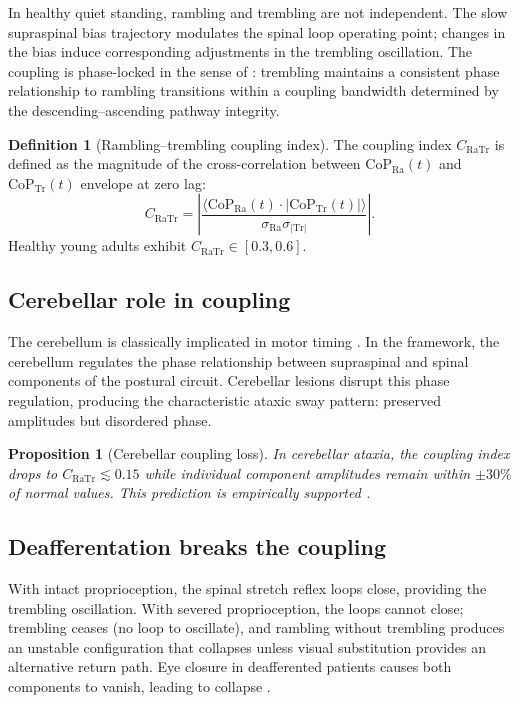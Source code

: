 \documentclass[11pt,twocolumn,a4paper]{article}
\newtheorem{proposition}[theorem]{Proposition}
\theoremstyle{definition}
\newtheorem{definition}[theorem]{Definition}
\theoremstyle{remark}
\newcommand{\Ra}{\mathrm{Ra}}
\newcommand{\Tr}{\mathrm{Tr}}
\begin{document}
In healthy quiet standing, rambling and trembling are not
independent. The slow supraspinal bias trajectory modulates the
spinal loop operating point; changes in the bias induce
corresponding adjustments in the trembling oscillation. The
coupling is phase-locked in the sense of \citet{kuramoto1984,%
strogatz2000}: trembling maintains a consistent phase relationship
to rambling transitions within a coupling bandwidth determined by
the descending--ascending pathway integrity.

\begin{definition}[Rambling--trembling coupling index]
The coupling index $C_{\Ra\Tr}$ is defined as the magnitude of the
cross-correlation between $\mathrm{CoP}_{\Ra}(t)$ and
$\mathrm{CoP}_{\Tr}(t)$ envelope at zero lag:
\begin{equation}
C_{\Ra\Tr} = \left| \frac{\langle \mathrm{CoP}_{\Ra}(t) \cdot |\mathrm{CoP}_{\Tr}(t)| \rangle}
{\sigma_{\Ra} \sigma_{|\Tr|}} \right|.
\end{equation}
Healthy young adults exhibit $C_{\Ra\Tr} \in [0.3, 0.6]$.
\end{definition}

\subsection{Cerebellar role in coupling}

The cerebellum is classically implicated in motor timing
\citep{ivry1989,thach1992}. In the framework, the cerebellum
regulates the phase relationship between supraspinal and spinal
components of the postural circuit. Cerebellar lesions disrupt
this phase regulation, producing the characteristic ataxic sway
pattern: preserved amplitudes but disordered phase.

\begin{proposition}[Cerebellar coupling loss]
In cerebellar ataxia, the coupling index drops to $C_{\Ra\Tr}
\lesssim 0.15$ while individual component amplitudes remain within
$\pm 30\%$ of normal values. This prediction is empirically
supported \citep{van2011ataxia,morton2004}.
\end{proposition}

\subsection{Deafferentation breaks the coupling}

With intact proprioception, the spinal stretch reflex loops close,
providing the trembling oscillation. With severed proprioception,
the loops cannot close; trembling ceases (no loop to oscillate),
and rambling without trembling produces an unstable configuration
that collapses unless visual substitution provides an alternative
return path. Eye closure in deafferented patients causes both
components to vanish, leading to collapse \citep{cole1991,%
lajoie1996}.
\end{document}
